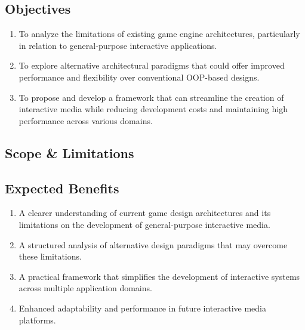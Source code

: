\subsection{Objectives}
\label{subsec:objectives}

\begin{enumerate}
    \item To analyze the limitations of existing game engine architectures, particularly in relation to general-purpose interactive applications.
    \item To explore alternative architectural paradigms that could offer improved performance and flexibility over conventional OOP-based designs.
    \item To propose and develop a framework that can streamline the creation of interactive media while reducing development costs and maintaining high performance across various domains.
\end{enumerate}

\subsection{Scope \& Limitations}
\label{subsec:scope-and-limitation}

\subsection{Expected Benefits}
\label{subsec:expected-benefits}

\begin{enumerate}
    \item A clearer understanding of current game design architectures and its limitations on the development of general-purpose interactive media.
    \item A structured analysis of alternative design paradigms that may overcome these limitations.
    \item A practical framework that simplifies the development of interactive systems across multiple application domains.
    \item Enhanced adaptability and performance in future interactive media platforms.
\end{enumerate}